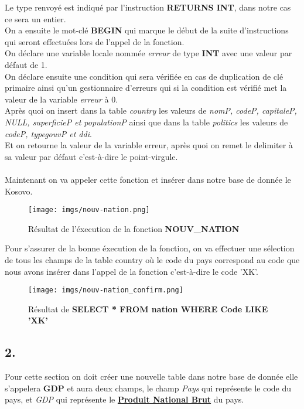 \documentclass[11pt,a4paper]{article}
\begin{document}
Le type renvoyé est indiqué par l'instruction \textbf{RETURNS INT}, dans notre cas ce sera un entier.\\
On a ensuite le mot-clé \textbf{BEGIN} qui marque le début de la suite d'instructions qui seront effectuées lors de l'appel de la fonction.\\
On déclare une variable locale nommée \emph{erreur} de type \textbf{INT} avec une valeur par défaut de 1.\\
On déclare ensuite une condition qui sera vérifiée en cas de duplication de clé primaire ainsi qu'un gestionnaire d'erreurs qui si la condition est vérifié met la valeur de la variable \emph{erreur} à 0.\\
Après quoi on insert dans la table \emph{country} les valeurs de \emph{nomP, codeP, capitaleP, NULL, superficieP et populationP} ainsi que dans la table \emph{politics} les valeurs de \emph{codeP, typegouvP et ddi}.\\
Et on retourne la valeur de la variable erreur, après quoi on remet le delimiter à sa valeur par défaut c'est-à-dire le point-virgule.\\
\\
Maintenant on va appeler cette fonction et insérer dans notre base de donnée le Kosovo.


\begin{figure}[h]
  \centering
  \texttt{[image: imgs/nouv-nation.png]}
  \caption{Résultat de l'éxecution de la fonction \textbf{NOUV\_NATION}}
  \label{fig1}
\end{figure}

Pour s'assurer de la bonne éxecution de la fonction, on va effectuer une sélection de tous les champs de la table country où le code du pays correspond au code que nous avons insérer dans l'appel de la fonction c'est-à-dire le code 'XK'.

\begin{figure}[h]
  \centering
  \texttt{[image: imgs/nouv-nation\_confirm.png]}
  \caption{Résultat de \textbf{SELECT * FROM nation WHERE Code LIKE 'XK'}}
  \label{fig2}
\end{figure}

\subsection*{2.}
Pour cette section on doit créer une nouvelle table dans notre base de donnée elle s'appelera \textbf{GDP} et aura deux champs, le champ \emph{Pays} qui représente le code du pays, et \emph{GDP} qui représente le \textbf{\underline{Produit National Brut}} du pays.
\end{document}
